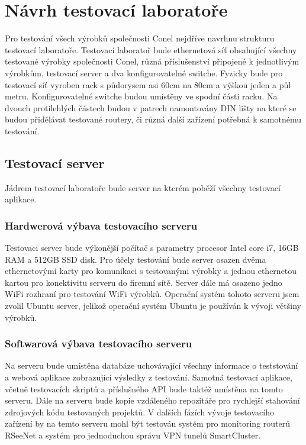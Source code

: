 \chapter{Návrh testovací laboratoře}

Pro testování všech výrobků společnosti Conel nejdříve navrhnu strukturu testovací laboratoře. Testovací laboratoř bude ethernetová síť obsahující všechny testované výrobky společnosti Conel, různá příslušenství připojené k jednotlivým výrobkům, testovací server a dva konfigurovatelné switche. Fyzicky bude pro testovací síť vyroben rack s půdorysem asi 60cm na 80cm a výškou jeden a půl metru. Konfigurovatelné switche budou umístěny ve spodní části racku. Na dvouch protilehlých částech budou v patrech namontovány DIN lišty na které se budou přidělávat testované routery, či různá další zařízení potřebná k samotnému testování.

\section{Testovací server}
Jádrem testovací laboratoře bude server na kterém poběží všechny testovací aplikace.

\subsection{Hardwerová výbava testovacího serveru}

Testovaci server bude výkonější počítač s parametry procesor Intel core i7, 16GB RAM a 512GB SSD disk. Pro účely testování bude server osazen dvěma ethernetovými karty pro komunikaci s testovanými výrobky a jednou ethernetou kartou pro konektivitu serveru do firemní sítě. Server dále má osazeno jedno WiFi rozhraní pro testování WiFi výrobků. Operační systém tohoto serveru jsem zvolil Ubuntu server, jelikož operační systém Ubuntu je používán k vývoji většiny výrobků.

\subsection{Softwarová výbava testovacího serveru}

Na serveru bude umístěna databáze uchovávající všechny informace o teststování a webová aplikace zobrazující výsledky z testování. Samotná testovací aplikace, včetně testovacích skriptů a příslušného API bude taktéž umístěna na tomto serveru. Dále na serveru bude kopie vzdáleného repozitáře pro rychlejší stahování zdrojových kódu testovaných projektů. V dalších fázích vývoje testovacího zařízení by na temto serveru mohl být testován systém pro monitoring routerů RSeeNet a systém pro jednoduchou správu VPN tunelů SmartCluster.

